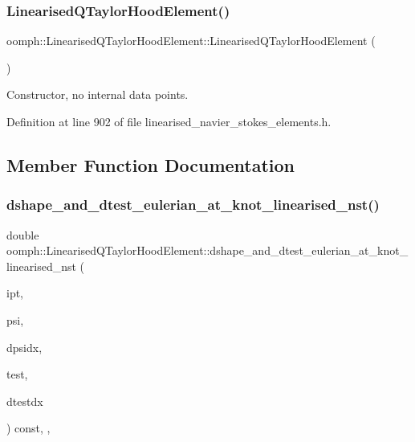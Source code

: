 \subsubsection{\texorpdfstring{Linearised\+Q\+Taylor\+Hood\+Element()}{LinearisedQTaylorHoodElement()}}
{\footnotesize\ttfamily oomph\+::\+Linearised\+Q\+Taylor\+Hood\+Element\+::\+Linearised\+Q\+Taylor\+Hood\+Element (\begin{DoxyParamCaption}{ }\end{DoxyParamCaption})\hspace{0.3cm}{\ttfamily [inline]}}



Constructor, no internal data points. 



Definition at line 902 of file linearised\+\_\+navier\+\_\+stokes\+\_\+elements.\+h.



\subsection{Member Function Documentation}
\mbox{\label{classoomph_1_1LinearisedQTaylorHoodElement_a03f34e02301c483325c4d77ed714ad56}} 
\subsubsection{\texorpdfstring{dshape\+\_\+and\+\_\+dtest\+\_\+eulerian\+\_\+at\+\_\+knot\+\_\+linearised\+\_\+nst()}{dshape\_and\_dtest\_eulerian\_at\_knot\_linearised\_nst()}}
{\footnotesize\ttfamily double oomph\+::\+Linearised\+Q\+Taylor\+Hood\+Element\+::dshape\+\_\+and\+\_\+dtest\+\_\+eulerian\+\_\+at\+\_\+knot\+\_\+linearised\+\_\+nst (\begin{DoxyParamCaption}\item[{const unsigned \&}]{ipt,  }\item[{\hyperlink{classoomph_1_1Shape}{Shape} \&}]{psi,  }\item[{\hyperlink{classoomph_1_1DShape}{D\+Shape} \&}]{dpsidx,  }\item[{\hyperlink{classoomph_1_1Shape}{Shape} \&}]{test,  }\item[{\hyperlink{classoomph_1_1DShape}{D\+Shape} \&}]{dtestdx }\end{DoxyParamCaption}) const\hspace{0.3cm}{\ttfamily [inline]}, {\ttfamily [protected]}, {\ttfamily [virtual]}}



